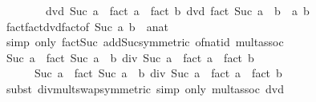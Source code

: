 \begin{isabellebody}
\ \ %
\isanewline
%
\isadelimproof
%
\endisadelimproof
%
\isatagproof
{}\isamarkupfalse%
\ {\isacharminus}{\kern0pt}\isanewline
\ \ \isamarkupfalse%
\ dvd{\isacharcolon}{\kern0pt}\ {\isachardoublequoteopen}Suc\ a\ {\isacharasterisk}{\kern0pt}\ {\isacharparenleft}{\kern0pt}fact\ a\ {\isacharasterisk}{\kern0pt}\ fact\ b{\isacharparenright}{\kern0pt}\ dvd\ fact\ {\isacharparenleft}{\kern0pt}Suc\ {\isacharparenleft}{\kern0pt}a\ {\isacharplus}{\kern0pt}\ b{\isacharparenright}{\kern0pt}{\isacharparenright}{\kern0pt}{\isachardoublequoteclose}\ \ a\ b\isanewline
\ \ \ \ \isamarkupfalse%
\ fact{\isacharunderscore}{\kern0pt}fact{\isacharunderscore}{\kern0pt}dvd{\isacharunderscore}{\kern0pt}fact{\isacharbrackleft}{\kern0pt}of\ {\isachardoublequoteopen}Suc\ a{\isachardoublequoteclose}\ {\isachardoublequoteopen}b{\isachardoublequoteclose}{\isacharcomma}{\kern0pt}\ \ {\isacharprime}{\kern0pt}a{\isacharequal}{\kern0pt}nat{\isacharbrackright}{\kern0pt}\isanewline
\ \ \ \ \isamarkupfalse%
\ {\isacharparenleft}{\kern0pt}simp\ only{\isacharcolon}{\kern0pt}\ fact{\isacharunderscore}{\kern0pt}Suc\ add{\isacharunderscore}{\kern0pt}Suc{\isacharbrackleft}{\kern0pt}symmetric{\isacharbrackright}{\kern0pt}\ of{\isacharunderscore}{\kern0pt}nat{\isacharunderscore}{\kern0pt}id\ mult{\isachardot}{\kern0pt}assoc{\isacharparenright}{\kern0pt}\isanewline
\ \ \isamarkupfalse%
\ {\isachardoublequoteopen}Suc\ a\ {\isacharasterisk}{\kern0pt}\ {\isacharparenleft}{\kern0pt}fact\ {\isacharparenleft}{\kern0pt}Suc\ {\isacharparenleft}{\kern0pt}a\ {\isacharplus}{\kern0pt}\ b{\isacharparenright}{\kern0pt}{\isacharparenright}{\kern0pt}\ div\ {\isacharparenleft}{\kern0pt}Suc\ a\ {\isacharasterisk}{\kern0pt}\ fact\ a\ {\isacharasterisk}{\kern0pt}\ fact\ b{\isacharparenright}{\kern0pt}{\isacharparenright}{\kern0pt}\ {\isacharequal}{\kern0pt}\isanewline
\ \ \ \ \ \ Suc\ a\ {\isacharasterisk}{\kern0pt}\ fact\ {\isacharparenleft}{\kern0pt}Suc\ {\isacharparenleft}{\kern0pt}a\ {\isacharplus}{\kern0pt}\ b{\isacharparenright}{\kern0pt}{\isacharparenright}{\kern0pt}\ div\ {\isacharparenleft}{\kern0pt}Suc\ a\ {\isacharasterisk}{\kern0pt}\ {\isacharparenleft}{\kern0pt}fact\ a\ {\isacharasterisk}{\kern0pt}\ fact\ b{\isacharparenright}{\kern0pt}{\isacharparenright}{\kern0pt}{\isachardoublequoteclose}\isanewline
\ \ \ \ \isamarkupfalse%
\ {\isacharparenleft}{\kern0pt}subst\ div{\isacharunderscore}{\kern0pt}mult{\isacharunderscore}{\kern0pt}swap{\isacharbrackleft}{\kern0pt}symmetric{\isacharbrackright}{\kern0pt}{\isacharsemicolon}{\kern0pt}\ simp\ only{\isacharcolon}{\kern0pt}\ mult{\isachardot}{\kern0pt}assoc\ dvd{\isacharparenright}{\kern0pt}\isanewline

\end{isabellebody}

